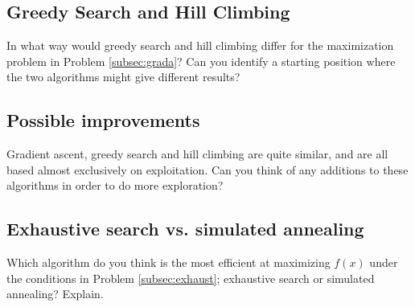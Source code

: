 \subsection{Greedy Search and Hill Climbing}
In what way would greedy search and hill climbing differ for the maximization problem in Problem \ref{subsec:grada}?
Can you identify a starting position where the two algorithms might give different results?

\subsection{Possible improvements}
Gradient ascent, greedy search and hill climbing are quite similar, and are all based almost exclusively on exploitation.
Can you think of any additions to these algorithms in order to do more exploration?

\subsection{Exhaustive search vs. simulated annealing}
Which algorithm do you think is the most efficient at maximizing \(f(x)\) under the conditions in Problem \ref{subsec:exhaust};
exhaustive search or simulated annealing? Explain.




